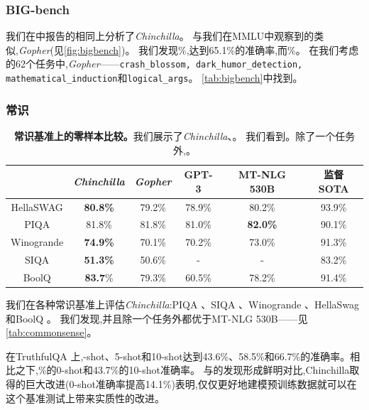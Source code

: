 \documentclass[11pt, a4paper, logo, copyright, nonumbering]{deepmind}
\newcommand{\gopher}{\textit{Gopher}\xspace}
\newcommand{\chinchilla}{\textit{Chinchilla}\xspace}
\newcommand{\mtnlg}{MT-NLG 530B\xspace}
\newcommand{\bigbench}{BIG-bench\xspace}
\begin{document}
\subsubsection{\bigbench}
我们在\citet{rae2021gopher}中报告的相同 \citep{bigbench}上分析了\chinchilla。
与我们在MMLU中观察到的类似,\gopher(见\autoref{fig:bigbench})。
我们发现\%,达到65.1\%的准确率,而\%。
在我们考虑的62个任务中,\gopher——\texttt{crash\_blossom, dark\_humor\_detection, mathematical\_induction}和\texttt{logical\_args}。
\autoref{tab:bigbench}中找到。

\subsubsection{常识}
\begin{table}[hb]
    \centering
    \begin{tabular}{cccccc}
    \toprule
    & \chinchilla & \gopher & GPT-3 & \mtnlg & 监督SOTA \\
    \midrule
    HellaSWAG & \textbf{80.8\%} & 79.2\% & 78.9\% & 80.2\% & 93.9\% \\
    PIQA & 81.8\% & 81.8\% & 81.0\% & \textbf{82.0\%} & 90.1\% \\
    Winogrande & \textbf{74.9\%} & 70.1\% & 70.2\% & 73.0\% & 91.3\% \\
    SIQA & \textbf{51.3\%} & 50.6\% & - & - & 83.2\% \\
    BoolQ & \textbf{83.7}\% & 79.3\% & 60.5\% & 78.2\%& 91.4\% \\
    \bottomrule
    \end{tabular}
    \caption{\textbf{常识基准上的零样本比较。}我们展示了\chinchilla、。
    我们看到。除了一个任务外,。
    }
    \label{tab:commonsense}
\end{table}
我们在各种常识基准上评估\chinchilla:PIQA \citep{piqa}、SIQA \citep{socialiqa}、Winogrande \citep{winogrande}、HellaSwag \citep{hellaswag}和BoolQ \citep{clark2019boolq}。
我们发现,并且除一个任务外都优于\mtnlg——见\autoref{tab:commonsense}。

在TruthfulQA \citep{truthfulqa}上,-shot、5-shot和10-shot达到43.6\%、58.5\%和66.7\%的准确率。相比之下,\%的0-shot和43.7\%的10-shot准确率。
与\citet{truthfulqa}的发现形成鲜明对比,Chinchilla取得的巨大改进(0-shot准确率提高14.1\%)表明,仅仅更好地建模预训练数据就可以在这个基准测试上带来实质性的改进。
\end{document}
